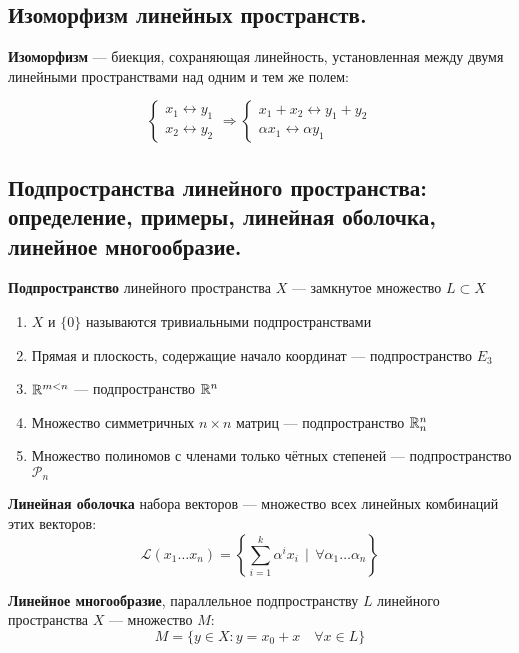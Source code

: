 \subsection{Изоморфизм линейных пространств.}
\begin{definition}
    \textbf{Изоморфизм} --- биекция, сохраняющая линейность, установленная между двумя линейными пространствами над одним и тем же полем:

    $$\begin{cases}
        x_1\leftrightarrow y_1 \\
        x_2\leftrightarrow y_2
    \end{cases} \Rightarrow \begin{cases}
        x_1+x_2\leftrightarrow y_1+y_2 \\
        \alpha x_1\leftrightarrow \alpha y_1
    \end{cases}$$
\end{definition}
\subsection{Подпространства линейного пространства: определение, примеры, линейная оболочка, линейное многообразие.}
\begin{definition}
    \textbf{Подпространство} линейного пространства $X$ --- замкнутое множество $L\subset X$
\end{definition}
\begin{example}
    \begin{enumerate}
        \item $X$ и $\{0\}$ называются тривиальными подпространствами
        \item Прямая и плоскость, содержащие начало координат --- подпространство $E_3$
        \item $\mathbb{R}^{m<n}$ --- подпространство $\mathbb{R}^n$
        \item Множество симметричных $n\times n$ матриц --- подпространство $\mathbb{R}^n_n$
        \item Множество полиномов с членами только чётных степеней --- подпространство $\mathcal{P}_n$
    \end{enumerate}
\end{example}
\begin{definition}
    \textbf{Линейная оболочка} набора векторов --- множество всех линейных комбинаций этих векторов: $$\mathcal{L}(x_1\ldots x_n)=\left\{\sum\limits_{i=1}^k \alpha^ix_i \ \ |\ \ \forall \alpha_1\ldots \alpha_n\right\}$$
\end{definition}
\begin{definition}
    \textbf{Линейное многообразие}, параллельное подпространству $L$ линейного пространства $X$ --- множество $M$: $$M=\{y\in X : y=x_0+x \quad \forall x\in L\}$$
\end{definition}
